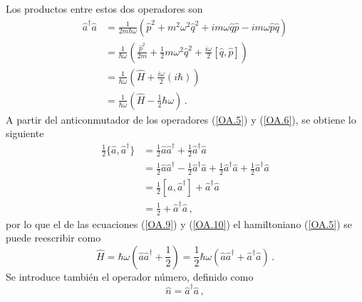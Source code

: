 Los productos entre estos dos operadores son
\begin{align}
  \hat{a}^{\dagger}\hat{a} & = \frac{1}{2m\hbar\omega} \left( \hat{p}^2 + m^2\omega^2\hat{q}^2 + im\omega\hat{q}\hat{p} - im\omega\hat{p}\hat{q} \right) \nonumber \\
                           & = \frac{1}{\hbar\omega}\left( \frac{\hat{p}^2}{2m} + \frac{1}{2}m\omega^2\hat{q}^2 +\frac{i\omega}{2} [\hat{q}, \hat{p}] \right)
  \nonumber                                                                                                                                                        \\
                           & = \frac{1}{\hbar\omega} \left( \hat{H} + \frac{i\omega}{2}(i\hbar) \right) \nonumber                                                  \\
                           & = \frac{1}{\hbar\omega} \left( \hat{H} - \frac{1}{2}\hbar\omega \right) \label{OA.9}\,.
\end{align}
A partir del anticonmutador de los operadores (\ref{OA.5}) y (\ref{OA.6}), se obtiene lo siguiente
\begin{align}
  \frac{1}{2}\{ \hat{a},\hat{a}^{\dagger}\} & = \frac{1}{2}\hat{a}\hat{a}^{\dagger} + \frac{1}{2}\hat{a}^{\dagger}\hat{a}                                                \nonumber                             \\
                                            & = \frac{1}{2}\hat{a}\hat{a}^{\dagger} - \frac{1}{2}\hat{a}^{\dagger}\hat{a} +\frac{1}{2}\hat{a}^{\dagger}\hat{a} + \frac{1}{2}\hat{a}^{\dagger}\hat{a} \nonumber \\
                                            & = \frac{1}{2}[\hat{a},\hat{a}^{\dagger}] + \hat{a}^{\dagger}\hat{a}                                                        \nonumber                             \\
                                            & = \frac{1}{2} + \hat{a}^{\dagger}\hat{a} \label{OA.10}\,,
\end{align}
por lo que el de las ecuaciones (\ref{OA.9}) y (\ref{OA.10}) el hamiltoniano (\ref{OA.5}) se puede reescribir como
\begin{equation}
  \label{OA.11}
  \hat{H} = \hbar \omega \left(\hat{a} \hat{a}^{\dagger} + \frac{1}{2}\right) = \frac{1}{2}\hbar \omega \left( \hat{a}\hat{a}^{\dagger} + \hat{a}^{\dagger}\hat{a} \right) \,.
\end{equation}
Se introduce también el operador número, definido como
\begin{equation}
  \label{OA.12}
  \hat{n} = \hat{a}^{\dagger} \hat{a}\,,
\end{equation}
